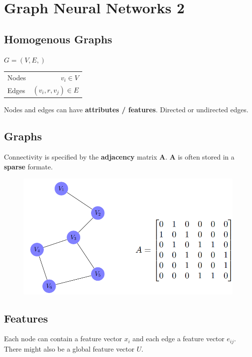 \section{Graph Neural Networks 2}
\subsection{Homogenous Graphs}
\(G = (V,E,)\)
\begin{table}[!h]
    \begin{tabular}{lr}
    Nodes     &  \(v_i \in V\)\\
    Edges      &  \((v_i,r,v_j) \in E\)
    \end{tabular}
\end{table}
Nodes and edges can have \textbf{attributes / features}.
Directed or undirected edges.

\subsection{Graphs}
Connectivity is specified by the \textbf{adjacency} matrix \textbf{A}.
\textbf{A} is often stored in a \textbf{sparse} formate.

\begin{figure}[!h]
    \includegraphics[width = \columnwidth]{figures/GraphNeuralNetworks2/SparseFormat.png}
\end{figure}

\subsection{Features}
Each node can contain a feature vector
\(x_i\) and each edge a feature vector \(e_{ij}\).
There might also be a global feature vector \(U\).

